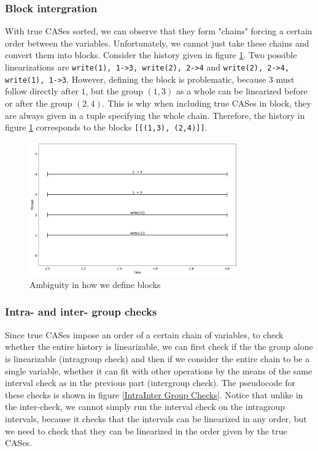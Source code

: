 \documentclass[oneside, a4paper, onecolumn, 10pt]{article}
\begin{document}
\subsubsection{Block intergration}
\noindent
With true CASes sorted, we can observe that they form "chains" forcing a certain order between the variables. Unfortunately, we cannot just take these chains and convert them into blocks. Consider the history given in figure \ref{Problematic Blockization}. Two possible linearizations are \verb|write(1), 1->3, write(2), 2->4| and \verb|write(2), 2->4, write(1), 1->3|. However, defining the block is problematic, because $3$ must follow directly after $1$, but the group $(1,3)$ as a whole can be linearized before or after the group $(2,4)$. This is why when including true CASes in block, they are always given in a tuple specifying the whole chain. Therefore, the history in figure \ref{Problematic Blockization} corresponds to the blocks \verb|[[(1,3), (2,4)]]|.
\begin{figure}[h]
  \centering
  \includegraphics[width=0.8\textwidth]{assets/ambiguous_true_cas_order.png}
  \caption{\label{Problematic Blockization}Ambiguity in how we define blocks}
\end{figure}
\subsubsection{Intra- and inter- group checks}
Since true CASes impose an order of a certain chain of variables, to check whether the entire history is linearizable, we can first check if the the group alone is linearizable (intragroup check) and then if we consider the entire chain to be a single variable, whether it can fit with other operations by the means of the same interval check as in the previous part (intergroup check). The pseudocode for these checks is shown in figure \ref{IntraInter Group Checks}. Notice that unlike in the inter-check, we cannot simply run the interval check on the intragroup intervals, because it checks that the intervals can be linearized in any order, but we need to check that they can be linearized in the order given by the true CASes.
\end{document}
